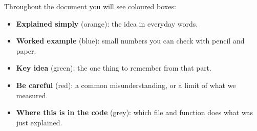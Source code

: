 Throughout the document you will see coloured boxes:
\begin{itemize}
  \item \textbf{Explained simply} (orange): the idea in everyday words.
  \item \textbf{Worked example} (blue): small numbers you can check with pencil and paper.
  \item \textbf{Key idea} (green): the one thing to remember from that part.
  \item \textbf{Be careful} (red): a common misunderstanding, or a limit of what we measured.
  \item \textbf{Where this is in the code} (grey): which file and function does what was just
        explained.
\end{itemize}
\newpage
